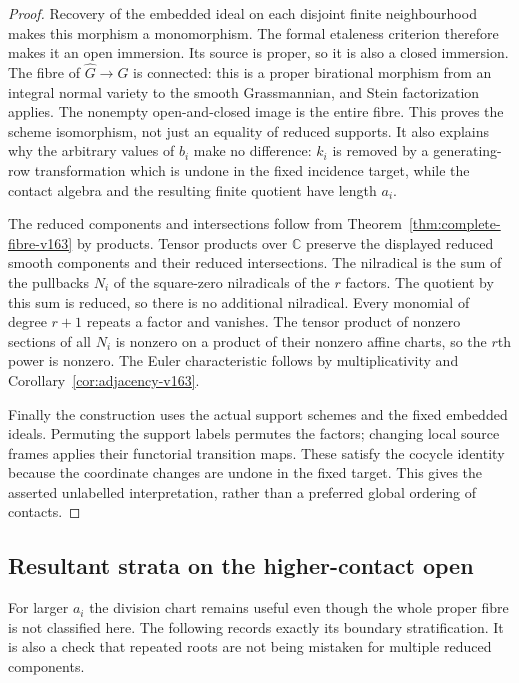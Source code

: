 \documentclass[11pt,reqno]{amsart}
\numberwithin{equation}{section}
\theoremstyle{definition}\newtheorem{definition}[theorem]{Definition}
\theoremstyle{remark}\newtheorem{remark}[theorem]{Remark}
\newcommand{\C}{\mathbb C}\newcommand{\Q}{\mathbb Q}
\begin{document}
\begin{proof}
Recovery of the embedded ideal on each disjoint finite neighbourhood
makes this morphism a monomorphism. The formal etaleness criterion
therefore makes it an open immersion. Its source is proper, so it
is also a closed immersion. The fibre of $\widehat G\to G$ is
connected: this is a proper birational morphism from an integral
normal variety to the smooth Grassmannian, and Stein factorization
applies. The nonempty open-and-closed image is the entire fibre.
This proves the scheme isomorphism, not just an equality of reduced
supports. It also explains why the arbitrary values of $b_i$ make
no difference: $k_i$ is removed by a generating-row transformation
which is undone in the fixed incidence target, while the contact
algebra and the resulting finite quotient have length $a_i$.

The reduced components and intersections follow from
Theorem~\ref{thm:complete-fibre-v163} by products. Tensor products
over $\C$ preserve the displayed reduced smooth components and
their reduced intersections. The nilradical is the sum of the
pullbacks $N_i$ of the square-zero nilradicals of the $r$ factors.
The quotient by this sum is reduced, so there is no additional
nilradical. Every monomial of degree $r+1$ repeats a factor and
vanishes. The tensor product of nonzero sections of all $N_i$ is
nonzero on a product of their nonzero affine charts, so the $r$th
power is nonzero. The Euler characteristic follows by multiplicativity
and Corollary~\ref{cor:adjacency-v163}.

Finally the construction uses the actual support schemes and the
fixed embedded ideals. Permuting the support labels permutes the
factors; changing local source frames applies their functorial
transition maps. These satisfy the cocycle identity because the
coordinate changes are undone in the fixed target. This gives the
asserted unlabelled interpretation, rather than a preferred global
ordering of contacts.
\end{proof}

\subsection{Resultant strata on the higher-contact open}
For larger $a_i$ the division chart remains useful even though the
whole proper fibre is not classified here. The following records
exactly its boundary stratification. It is also a check that repeated
roots are not being mistaken for multiple reduced components.
\end{document}
